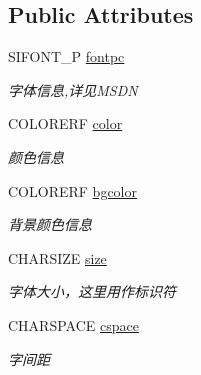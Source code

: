 \subsection*{Public Attributes}
\begin{DoxyCompactItemize}
\item 
S\+I\+F\+O\+N\+T\+\_\+P \hyperlink{class_s_i_c_h_a_r___i_n_f_o_a8d998c494943882d98981f79f620460d}{fontpc}
\begin{DoxyCompactList}\small\item\em 字体信息,详见\+M\+S\+DN \end{DoxyCompactList}\item 
\mbox{\label{class_s_i_c_h_a_r___i_n_f_o_ab9605aad10f9e033ed8e004468beeab9}} 
C\+O\+L\+O\+R\+E\+RF \hyperlink{class_s_i_c_h_a_r___i_n_f_o_ab9605aad10f9e033ed8e004468beeab9}{color}
\begin{DoxyCompactList}\small\item\em 颜色信息  \end{DoxyCompactList}\item 
\mbox{\label{class_s_i_c_h_a_r___i_n_f_o_a838a052749c0c04c6f20c633b1cc4432}} 
C\+O\+L\+O\+R\+E\+RF \hyperlink{class_s_i_c_h_a_r___i_n_f_o_a838a052749c0c04c6f20c633b1cc4432}{bgcolor}
\begin{DoxyCompactList}\small\item\em 背景颜色信息  \end{DoxyCompactList}\item 
\mbox{\label{class_s_i_c_h_a_r___i_n_f_o_abcc72d98471148d54e334f9528103a50}} 
C\+H\+A\+R\+S\+I\+ZE \hyperlink{class_s_i_c_h_a_r___i_n_f_o_abcc72d98471148d54e334f9528103a50}{size}
\begin{DoxyCompactList}\small\item\em 字体大小，这里用作标识符  \end{DoxyCompactList}\item 
\mbox{\label{class_s_i_c_h_a_r___i_n_f_o_a575d876eda778563dec0f72bd4bc06ea}} 
C\+H\+A\+R\+S\+P\+A\+CE \hyperlink{class_s_i_c_h_a_r___i_n_f_o_a575d876eda778563dec0f72bd4bc06ea}{cspace}
\begin{DoxyCompactList}\small\item\em 字间距  \end{DoxyCompactList}\item 

\end{DoxyCompactItemize}
